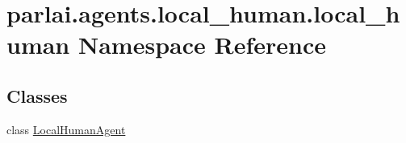 \hypertarget{namespaceparlai_1_1agents_1_1local__human_1_1local__human}{}\section{parlai.\+agents.\+local\+\_\+human.\+local\+\_\+human Namespace Reference}
\label{namespaceparlai_1_1agents_1_1local__human_1_1local__human}
\subsection*{Classes}
\begin{DoxyCompactItemize}
\item 
class \hyperlink{classparlai_1_1agents_1_1local__human_1_1local__human_1_1LocalHumanAgent}{Local\+Human\+Agent}
\end{DoxyCompactItemize}
